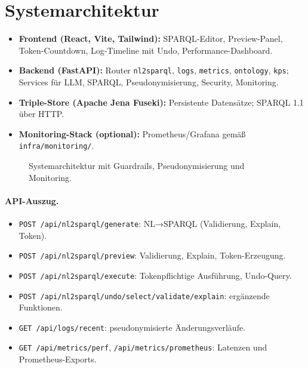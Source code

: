 \section{Systemarchitektur}
\label{subsec:arch-backend}
\begin{itemize}
  \item \textbf{Frontend (React, Vite, Tailwind):} SPARQL-Editor, Preview-Panel, Token-Countdown, Log-Timeline mit Undo, Performance-Dashboard.
  \item \textbf{Backend (FastAPI):} Router \texttt{nl2sparql}, \texttt{logs}, \texttt{metrics}, \texttt{ontology}, \texttt{kps}; Services für LLM, SPARQL, Pseudonymisierung, Security, Monitoring.
  \item \textbf{Triple-Store (Apache Jena Fuseki):} Persistente Datensätze; SPARQL 1.1 über HTTP.
  \item \textbf{Monitoring-Stack (optional):} Prometheus/Grafana gemäß \texttt{infra/monitoring/}.
\end{itemize}

\begin{figure}[ht]
  \centering
  
  \caption{Systemarchitektur mit Guardrails, Pseudonymisierung und Monitoring.}
  \label{fig:architecture}
\end{figure}

\paragraph{API-Auszug.}
\begin{itemize}
  \item \texttt{POST /api/nl2sparql/generate}: NL→SPARQL (Validierung, Explain, Token).
  \item \texttt{POST /api/nl2sparql/preview}: Validierung, Explain, Token-Erzeugung.
  \item \texttt{POST /api/nl2sparql/execute}: Tokenpflichtige Ausführung, Undo-Query.
  \item \texttt{POST /api/nl2sparql/undo/select/validate/explain}: ergänzende Funktionen.
  \item \texttt{GET /api/logs/recent}: pseudonymisierte Änderungsverläufe.
  \item \texttt{GET /api/metrics/perf}, \texttt{/api/metrics/prometheus}: Latenzen und Prometheus-Exports.
\end{itemize}

